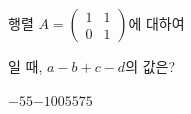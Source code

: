 \hspace*{2mm}\begin{minipage}[t]{\dimexpr\linewidth-2mm\relax}\vspace{0pt}
행렬 $A=\begin{pmatrix} 1 & 1 \\ 0 & 1 \end{pmatrix}$에 대하여 \par\smallskip{}\par\smallskip\noindent 일 때, $a-b+c-d$의 값은?
\begin{choices32}{$-55$}{$-10$}{$0$}{$55$}{$75$}\end{choices32}\end{minipage}
